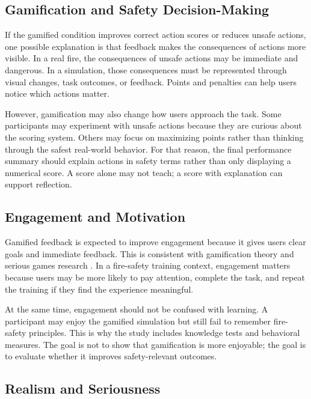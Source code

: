 \documentclass[manuscript, review]{acmart}
\begin{document}
{\subsection{Gamification and Safety Decision-Making}

If the gamified condition improves correct action scores or reduces unsafe actions, one possible explanation is that feedback makes the consequences of actions more visible. In a real fire, the consequences of unsafe actions may be immediate and dangerous. In a simulation, those consequences must be represented through visual changes, task outcomes, or feedback. Points and penalties can help users notice which actions matter.

However, gamification may also change how users approach the task. Some participants may experiment with unsafe actions because they are curious about the scoring system. Others may focus on maximizing points rather than thinking through the safest real-world behavior. For that reason, the final performance summary should explain actions in safety terms rather than only displaying a numerical score. A score alone may not teach; a score with explanation can support reflection.

\subsection{Engagement and Motivation}

Gamified feedback is expected to improve engagement because it gives users clear goals and immediate feedback. This is consistent with gamification theory and serious games research \cite{deterding2011gamification,kapp2012gamification,prensky2001digital}. In a fire-safety training context, engagement matters because users may be more likely to pay attention, complete the task, and repeat the training if they find the experience meaningful.

At the same time, engagement should not be confused with learning. A participant may enjoy the gamified simulation but still fail to remember fire-safety principles. This is why the study includes knowledge tests and behavioral measures. The goal is not to show that gamification is more enjoyable; the goal is to evaluate whether it improves safety-relevant outcomes.

\subsection{Realism and Seriousness}

}
\end{document}
